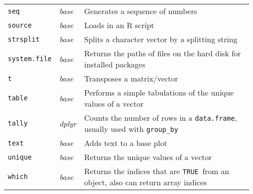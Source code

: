 \documentclass[10pt,landscape]{article}
\newcommand{\code}[1]{\texttt{#1}}
\newcommand{\pkg}[1]{\emph{#1}}
\newcommand{\TRUE}{\texttt{TRUE }}
\begin{document}
\begin{tabular}{lll}
\code{seq} & \pkg{base} & Generates a sequence of numbers \\
\code{source} & \pkg{base} & Loads in an R script \\
\code{strsplit} & \pkg{base} & Splits a character vector by a splitting string \\
\code{system.file} & \pkg{base} & Returns the paths of files on the hard disk for installed packages\\
\code{t} & \pkg{base} & Transposes a matrix/vector \\
\code{table} & \pkg{base} & Performs a simple tabulations of the unique values of a vector\\
\code{tally} & \pkg{dplyr} & Counts the number of rows in a \code{data.frame}, usually used with \code{group\_by} \\
\code{text} & \pkg{base} & Adds text to a base plot \\
\code{unique} & \pkg{base} & Returns the unique values of a vector \\
\code{which} & \pkg{base} & Returns the indices that are \TRUE from an object, also can return array indices \\
\end{tabular}

\clearpage 
\end{document}
